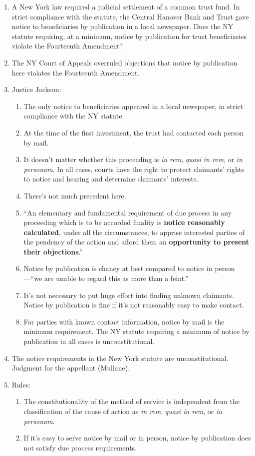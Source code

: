 \begin{enumerate}
    \item A New York law required a judicial settlement of a common trust fund. In strict compliance with the statute, the Central Hanover Bank and Trust gave notice to beneficiaries by publication in a local newspaper. Does the NY statute requiring, at a minimum, notice by publication for trust beneficiaries violate the Fourteenth Amendment?
    \item The NY Court of Appeals overruled objections that notice by publication here violates the Fourteenth Amendment.
    \item Justice Jackson:
    \begin{enumerate}
        \item The only notice to beneficiaries appeared in a local newspaper, in strict compliance with the NY statute.
        \item At the time of the first investment, the trust had contacted each person by mail.
        \item It doesn't matter whether this proceeding is \emph{in rem}, \emph{quasi in rem}, or \emph{in personam}. In all cases, courts have the right to protect claimants' rights to notice and hearing and determine claimants' interests.
        \item There's not much precedent here.
        \item ``An elementary and fundamental requirement of due process in any proceeding which is to be accorded finality is \textbf{notice reasonably calculated}, under all the circumstances, to apprise interested parties of the pendency of the action and afford them an \textbf{opportunity to present their objections}.''
        \item Notice by publication is chancy at best compared to notice in person---``we are unable to regard this as more than a feint.''
        \item It's not necessary to put huge effort into finding unknown claimants. Notice by publication is fine if it's not reasonably easy to make contact.
        \item For parties with known contact information, notice by mail is the minimum requirement. The NY statute requiring a minimum of notice by publication in all cases is unconstitutional.
    \end{enumerate}
    \item The notice requirements in the New York statute are unconstitutional. Judgment for the appellant (Mullane).
    \item Rules:
    \begin{enumerate}
       \item  The constitutionality of the method of service is independent from the classification of the cause of action as \emph{in rem}, \emph{quasi in rem}, or \emph{in personam}.
        \item If it's easy to serve notice by mail or in person, notice by publication does not satisfy due process requirements.
    \end{enumerate}
\end{enumerate}

